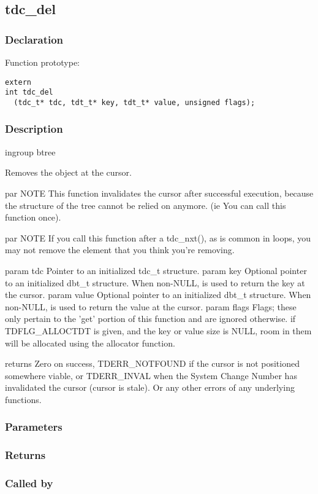 
\newpage
\subsection{tdc\_del}
\subsubsection{Declaration} Function prototype:

\begin{verbatim}
extern
int tdc_del
  (tdc_t* tdc, tdt_t* key, tdt_t* value, unsigned flags);
\end{verbatim}

\subsubsection{Description}


 ingroup btree

 Removes the object at the cursor.

 par NOTE
 This function invalidates the cursor after successful execution,
 because the structure of the tree cannot be relied on anymore.
 (ie You can call this function once).

 par NOTE
 If you call this function after a tdc\_nxt(), as is common in loops,
 you may not remove the element that you think you're removing.

 param tdc    Pointer to an initialized tdc\_t structure.
 param key    Optional pointer to an initialized dbt\_t structure.
               When non-NULL, is used to return the key at the cursor.
 param value  Optional pointer to an initialized dbt\_t structure.
               When non-NULL, is used to return the value at the cursor.
 param flags  Flags; these only pertain to the 'get' portion of this
               function and are ignored otherwise.
               if TDFLG\_ALLOCTDT is given, and the key or value
               size is NULL, room in them will be allocated using the
               allocator function.

 returns Zero on success, TDERR\_NOTFOUND if the cursor is not positioned
          somewhere viable, or TDERR\_INVAL when the System Change Number
          has invalidated the cursor (cursor is stale).
          Or any other errors of any underlying functions.
 

\subsubsection{Parameters}
\subsubsection{Returns}
\subsubsection{Called by}
